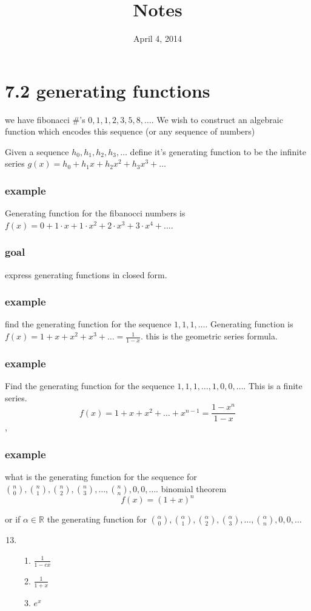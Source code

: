 \documentclass{article}
\begin{document}
\title{Notes}
\date{April 4, 2014}
\maketitle
\section*{7.2 generating functions}
we have fibonacci \#'s $0,1,1,2,3,5,8,\dots$. We wish to construct an algebraic function which encodes this sequence (or any sequence of numbers)

Given a sequence $h_0,h_1,h_2,h_3,\dots$ define it's generating function to be the infinite series $g(x)=h_0+h_1x+h_2x^2+h_3x^3+\dots$

\subsubsection*{example}
Generating function for the fibanocci numbers is $f(x)=0+1\cdot x+1\cdot x^2+2\cdot x^3+3\cdot x^4+\dots$.

\subsubsection*{goal}
express generating functions in closed form.

\subsubsection*{example}
find the generating function for the sequence $1,1,1,\dots$. Generating function is $f(x)=1+x+x^2+x^3+\dots=\frac{1}{1-x}$. this is the geometric series formula.

\subsubsection*{example}
Find the generating function for the sequence $1,1,1,\dots,1,0,0,\dots$. This is a finite series.
\[f(x)=1+x+x^2+\dots+x^{n-1}=\frac{1-x^n}{1-x}\]
,
\subsubsection*{example}
what is the generating function for the sequence for $\binom{n}{0},\binom{n}{1},\binom{n}{2},\binom{n}{3},\dots,\binom{n}{n},0,0,\dots$. binomial theorem
\[f(x)=(1+x)^n\]

or if $\alpha\in\mathbb{R}$ the generating function for $\binom{\alpha}{0},\binom{\alpha}{1},\binom{\alpha}{2},\binom{\alpha}{3},\dots,\binom{\alpha}{n},0,0,\dots$
\begin{enumerate}
\setcounter{enumi}{12}
\item
\begin{enumerate}
\item
$\frac{1}{1-cx}$
\item
$\frac{1}{1+x}$
\setcounter{enumii}{3}
\item
$e^x$
\end{enumerate}
\end{enumerate}
\end{document}
